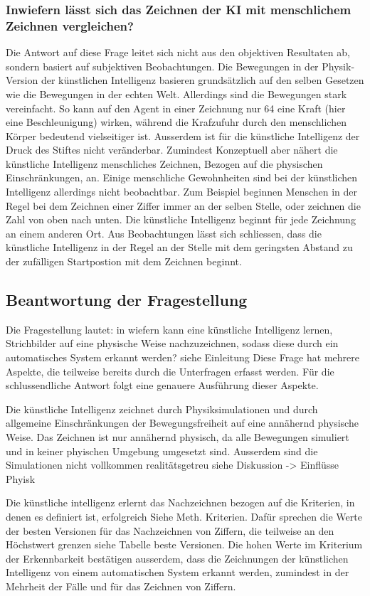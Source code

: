 \subsubsection*{Inwiefern lässt sich das Zeichnen der KI mit menschlichem Zeichnen vergleichen?}
Die Antwort auf diese Frage leitet sich nicht aus den objektiven Resultaten
ab, sondern basiert auf subjektiven Beobachtungen. Die Bewegungen in der
Physik-Version der künstlichen Intelligenz basieren grundsätzlich auf den
selben Gesetzen wie die Bewegungen in der echten Welt. Allerdings sind die
Bewegungen stark vereinfacht. So kann auf den Agent in einer Zeichnung nur 64
eine Kraft (hier eine Beschleunigung) wirken, während die Krafzufuhr durch den
menschlichen Körper bedeutend vielseitiger ist. Ausserdem ist für die
künstliche Intelligenz der Druck des Stiftes nicht veränderbar. Zumindest
Konzeptuell aber nähert die künstliche Intelligenz menschliches Zeichnen,
Bezogen auf die physischen Einschränkungen, an. Einige menschliche
Gewohnheiten sind bei der künstlichen Intelligenz allerdings nicht
beobachtbar. Zum Beispiel beginnen Menschen in der Regel bei dem Zeichnen
einer Ziffer immer an der selben Stelle, oder zeichnen die Zahl von oben nach
unten. Die künstliche Intelligenz beginnt für jede Zeichnung an einem anderen
Ort. Aus Beobachtungen lässt sich schliessen, dass die künstliche Intelligenz
in der Regel an der Stelle mit dem geringsten Abstand zu der zufälligen
Startpostion mit dem Zeichnen beginnt.


\subsection{Beantwortung der Fragestellung}
Die Fragestellung lautet: in wiefern kann eine künstliche Intelligenz lernen,
Strichbilder auf eine physische Weise nachzuzeichnen, sodass diese durch ein
automatisches System erkannt werden? {siehe Einleitung} Diese Frage hat mehrere
Aspekte, die teilweise bereits durch die Unterfragen erfasst werden. Für die
schlussendliche Antwort folgt eine genauere Ausführung dieser Aspekte.

Die künstliche Intelligenz zeichnet durch Physiksimulationen und durch allgemeine
Einschränkungen der Bewegungsfreiheit auf eine annähernd physische Weise. Das
Zeichnen ist nur annähernd physisch, da alle Bewegungen simuliert und in
keiner phyischen Umgebung umgesetzt sind. Ausserdem sind die Simulationen
nicht vollkommen realitätsgetreu {siehe Diskussion -> Einflüsse Phyisk }

Die künstliche intelligenz erlernt das Nachzeichnen bezogen auf die Kriterien,
in denen es definiert ist, erfolgreich {Siehe Meth. Kriterien}. Dafür sprechen
die Werte der besten Versionen für das Nachzeichnen von Ziffern, die teilweise
an den Höchstwert grenzen {siehe Tabelle beste Versionen}. Die hohen Werte im
Kriterium der Erkennbarkeit bestätigen ausserdem, dass die Zeichnungen der
künstlichen Intelligenz von einem automatischen System erkannt werden, zumindest
in der Mehrheit der Fälle und für das Zeichnen von Ziffern.


